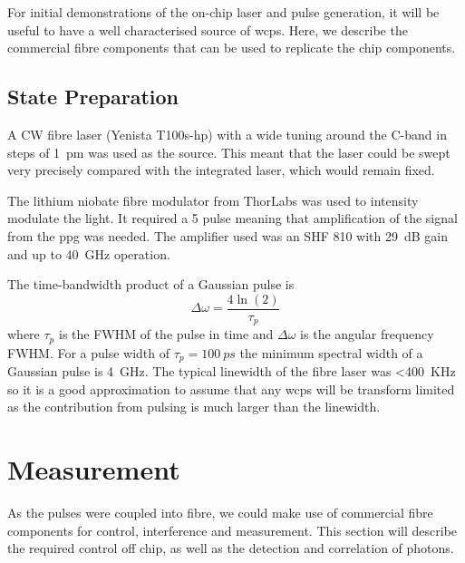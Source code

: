 For initial demonstrations of the on-chip laser and pulse generation, it will be useful to have a well characterised source of \acp{wcp}. Here, we describe the commercial fibre components that can be used to replicate the chip components.

\subsection{State Preparation}

A \ac{CW} fibre laser (Yenista T100s-hp) with a wide tuning around the C-band in steps of \SI{1}{\pm} was used as the source. This meant that the laser could be swept very precisely compared with the integrated laser, which would remain fixed. 

The lithium niobate fibre modulator from ThorLabs was used to intensity modulate the light. It required a \SI{5}{\Vpp} pulse meaning that amplification of the signal from the \ac{ppg} was needed. The amplifier used was an SHF 810 with \SI{29}{dB} gain and up to \SI{40}{\GHz} operation.

The time-bandwidth product of a Gaussian pulse is
\begin{equation}
	\Delta \omega = \frac{4 \ln(2)}{\tau_p}
\end{equation}
where $\tau_p$ is the \ac{FWHM} of the pulse in time and $\Delta \omega$ is the angular frequency \ac{FWHM}. For a pulse width of $\tau_p = \SI{100}{ps}$ the minimum spectral width of a Gaussian pulse is \SI{4}{GHz}. The typical linewidth of the fibre laser was \SI{<400}{KHz} so it is a good approximation to assume that any \acp{wcp} will be transform limited as the contribution from pulsing is much larger than the linewidth.

\section{Measurement}



As the pulses were coupled into fibre, we could make use of commercial fibre components for control, interference and measurement. This section will describe the required control off chip, as well as the detection and correlation of photons.

